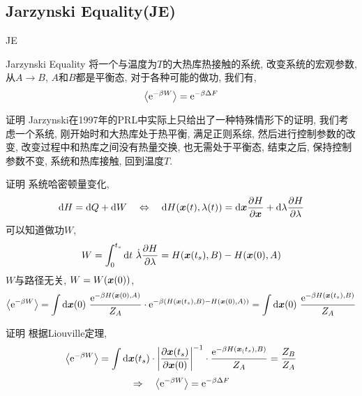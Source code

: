     \subsection{Jarzynski Equality(JE)}
    \begin{frame}{JE}
        \begin{alertblock}{Jarzynski Equality}
            将一个与温度为$T$的大热库热接触的系统, 改变系统的宏观参数, 从$A\to B$, $A$和$B$都是平衡态, 对于各种可能的做功, 我们有,
            \begin{equation}
                \expval{\mathrm{e}^{-\beta W}} = \mathrm{e}^{-\beta \Delta F}
            \end{equation}
        \end{alertblock}   
    \end{frame}
    \begin{frame}{证明}
        Jarzynski在1997年的PRL中实际上只给出了一种特殊情形下的证明, 我们考虑一个系统, 刚开始时和大热库处于热平衡, 满足正则系综, 然后进行控制参数的改变, 改变过程中和热库之间没有热量交换, 也无需处于平衡态, 结束之后, 保持控制参数不变, 系统和热库接触, 回到温度$T$. 
        
    \end{frame}
    \begin{frame}{证明}
        系统哈密顿量变化,
        \begin{equation}
            \dd H = \dd Q + \dd W \quad\Leftrightarrow\quad \dd{H(\vb*x(t),\lambda(t))} = \dd\vb*x\pdv{H}{\vb*x}  + \dd\lambda\pdv{H}{\lambda}
        \end{equation}
        可以知道做功$W$,
        \begin{equation}
            W = \int_0^{t_s} \dd t\ \dot\lambda\pdv{H}{\lambda} = H(\vb*x(t_s),B) - H(\vb*x(0),A)
        \end{equation}
        $W$与路径无关, $W = W(\vb*x(0))$,
        \begin{equation}
            \expval{\ee^{-\beta W}} = \int \dd\vb*x(0)\ \frac{\ee^{-\beta H(\vb*x(0),A)}}{Z_A} \cdot \ee^{-\beta(H(\vb*x(t_s),B) - H(\vb*x(0),A))} = \int  \dd\vb*x(0)\ \frac{\ee^{-\beta H(\vb*x(t_s),B)}}{Z_A}
        \end{equation}
    \end{frame}
    \begin{frame}{证明}
        根据Liouville定理,
        \begin{equation*}
            \expval{\mathrm{e}^{-\beta W}} = \int \dd\vb*x(t_s) \cdot \left|\pdv{\vb*x(t_s)}{\vb*x(0)}\right|^{-1} \cdot \frac{\mathrm{e}^{-\beta H(\vb*x_(t_s),B)}}{Z_A} = \frac{Z_B}{Z_A}
        \end{equation*}
        \begin{equation}
            \Rightarrow\quad \expval{\mathrm{e}^{-\beta W}} = \mathrm{e}^{-\beta \Delta F}
        \end{equation}
    \end{frame}

